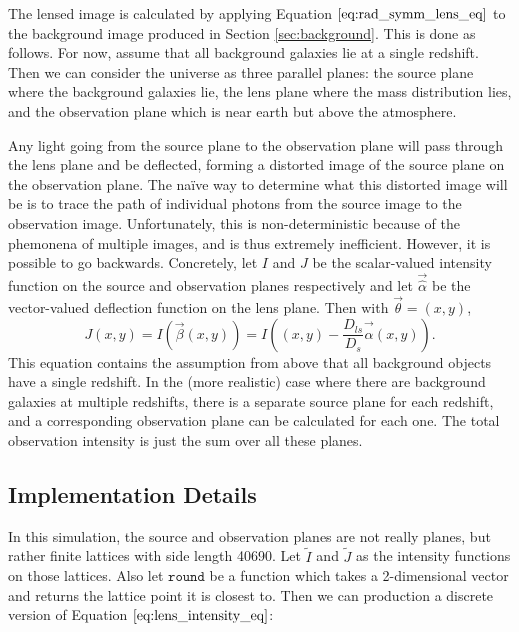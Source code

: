 \documentclass[10pt,twoside]{article}
\theoremstyle{definition}
\theoremstyle{exercise}
\begin{document}
The lensed image is calculated by applying Equation $\eqref{eq:rad_symm_lens_eq}$ to the background image produced in Section \ref{sec:background}. This is done as follows. For now, assume that all background galaxies lie at a single redshift. Then we can consider the universe as three parallel planes: the source plane where the background galaxies lie, the lens plane where the mass distribution lies, and the observation plane which is near earth but above the atmosphere.

Any light going from the source plane to the observation plane will pass through the lens plane and be deflected, forming a distorted image of the source plane on the observation plane. The na\"ive way to determine what this distorted image will be is to trace the path of individual photons from the source image to the observation image. Unfortunately, this is non-deterministic because of the phemonena of multiple images, and is thus extremely inefficient. However, it is possible to go backwards. Concretely, let $I$ and $J$ be the scalar-valued intensity function on the source and observation planes respectively and let $\vec{\hat{\alpha}}$ be the vector-valued deflection function on the lens plane. Then with $\vec{\theta} = (x, y)$,
\begin{equation}
  J(x,y) = I\left( \vec{\beta}(x,y)\right) = I\left( (x,y)- \frac{D_{ls}}{D_s} \vec{\hat{\alpha}}(x,y) \right).
  \label{eq:lens_intensity_eq}
\end{equation}
This equation contains the assumption from above that all background objects have a single redshift. In the (more realistic) case where there are background galaxies at multiple redshifts, there is a separate source plane for each redshift, and a corresponding observation plane can be calculated for each one. The total observation intensity is just the sum over all these planes.


\subsection{Implementation Details}
In this simulation, the source and observation planes are not really planes, but rather finite lattices with side length 40690. Let $\tilde{I}$ and $\tilde{J}$ as the intensity functions on those lattices. Also let $\texttt{round}$ be a function which takes a 2-dimensional vector and returns the lattice point it is closest to. Then we can production a discrete version of Equation $\eqref{eq:lens_intensity_eq}$:
\end{document}
